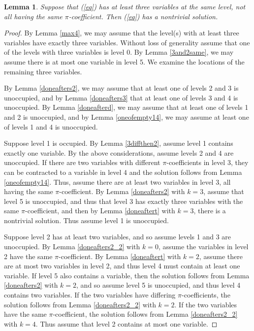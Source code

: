 \documentclass{article}
\newtheorem{lemma}{Lemma}
\begin{document}
\begin{lemma}\label{max3_1}
Suppose that (\ref{eq}) has at least three variables at the same level, not all having the same $\pi$-coefficient.  Then (\ref{eq}) has a nontrivial solution.
\end{lemma}
\begin{proof}

By Lemma \ref{max4}, we may assume that the level(s) with at least three variables have exactly three variables.  Without loss of generality assume that one of the levels with three variables is level 0.  By Lemma \ref{3and2same}, we may assume there is at most one variable in level 5.  We examine the locations of the remaining three variables.

By Lemma \ref{doneafters2}, we may assume that at least one of levels 2 and 3 is unoccupied, and by Lemma \ref{doneafters3} that at least one of levels 3 and 4 is unoccupied.  By Lemma \ref{doneafterd}, we may assume that at least one of levels 1 and 2 is unoccupied, and by Lemma \ref{oneofempty14}, we may assume at least one of levels 1 and 4 is unoccupied.

Suppose level 1 is occupied.  By Lemma \ref{3diffthen2}, assume level 1 contains exactly one variable.  By the above considerations, assume levels 2 and 4 are unoccupied.  If there are two variables with different $\pi$-coefficients in level 3, they can be contracted to a variable in level 4 and the solution follows from Lemma \ref{oneofempty14}.  Thus, assume there are at least two variables in level 3, all having the same $\pi$-coefficient.  By Lemma \ref{doneafters2} with $k=3$, assume that level 5 is unoccupied, and thus that level 3 has exactly three variables with the same $\pi$-coefficient, and then by Lemma \ref{doneaftert} with $k=3$, there is a nontrivial solution.  Thus assume level 1 is unoccupied.

Suppose level 2 has at least two variables, and so assume levels 1 and 3 are unoccupied.  By Lemma \ref{doneafters2_2} with $k=0$, assume the variables in level 2 have the same $\pi$-coefficient.  By Lemma \ref{doneaftert} with $k=2$, assume there are at most two variables in level 2, and thus level 4 must contain at least one variable.  If level 5 also contains a variable, then the solution follows from Lemma \ref{doneafters2} with $k=2$, and so assume level 5 is unoccupied, and thus level 4 contains two variables.  If the two variables have differing $\pi$-coefficients, the solution follows from Lemma \ref{doneafters2_2} with $k=2$.  If the two variables have the same $\pi$-coefficient, the solution follows from Lemma \ref{doneafters2_2} with $k=4$.  Thus assume that level 2 contains at most one variable.


\end{proof}
\end{document}
